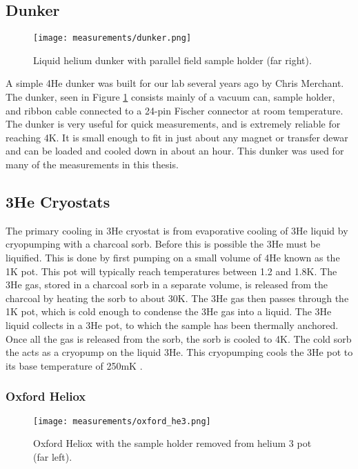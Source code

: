 \subsection{Dunker}

\begin{figure}
    \centering
    \texttt{[image: measurements/dunker.png]}
    \caption{Liquid helium dunker with parallel field sample holder (far right).}
    \label{fig:dunker}
\end{figure}

A simple 4He dunker was built for our lab several years ago by Chris Merchant. The dunker, seen in Figure \ref{fig:dunker} consists mainly of a vacuum can, sample holder, and ribbon cable connected to a 24-pin Fischer connector at room temperature. The dunker is very useful for quick measurements, and is extremely reliable for reaching 4K. It is small enough to fit in just about any magnet or transfer dewar and can be loaded and cooled down in about an hour. This dunker was used for many of the measurements in this thesis.

\subsection{3He Cryostats}

The primary cooling in 3He cryostat is from evaporative cooling of 3He liquid by cryopumping with a charcoal sorb. Before this is possible the 3He must be liquified. This is done by first pumping on a small volume of 4He known as the 1K pot. This pot will typically reach temperatures between 1.2 and 1.8K. The 3He gas, stored in a charcoal sorb in a separate volume, is released from the charcoal by heating the sorb to about 30K. The 3He gas then passes through the 1K pot, which is cold enough to condense the 3He gas into a liquid. The 3He liquid collects in a 3He pot, to which the sample has been thermally anchored. Once all the gas is released from the sorb, the sorb is cooled to 4K. The cold sorb the acts as a cryopump on the liquid 3He. This cryopumping cools the 3He pot to its base temperature of 250mK \cite{Balshaw2001}.

\subsubsection*{Oxford Heliox}

\begin{figure}
    \centering
    \texttt{[image: measurements/oxford\_he3.png]}
    \caption{Oxford Heliox with the sample holder removed from helium 3 pot (far left).}
    \label{fig:heliox}
\end{figure}

